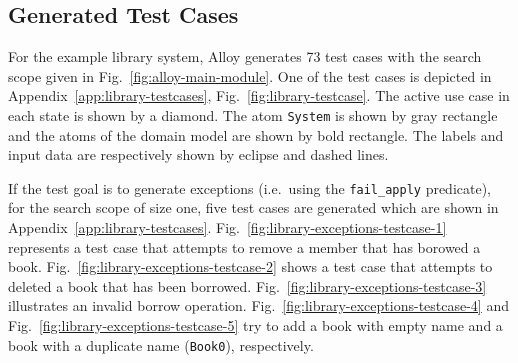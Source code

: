 \subsection{Generated Test Cases}
\label{sec:alloy-test-cases}
For the example library system, Alloy generates 73 test cases with the search scope given in Fig.~\ref{fig:alloy-main-module}. One of the test cases is depicted in Appendix~\ref{app:library-testcases}, Fig.~\ref{fig:library-testcase}. The active use case in each state is shown by a diamond. The atom \texttt{System} is shown by gray rectangle and the atoms of the domain model are shown by bold rectangle. The labels and input data are respectively shown by eclipse and dashed lines.

If the test goal is to generate exceptions (i.e.\ using the \texttt{fail\_apply} predicate), for the search scope of size one, five test cases are generated which are shown in Appendix~\ref{app:library-testcases}. Fig.~\ref{fig:library-exceptions-testcase-1} represents a test case that attempts to remove a member that has borowed a book. Fig.~\ref{fig:library-exceptions-testcase-2} shows a test case that attempts to deleted a book that has been borrowed. Fig.~\ref{fig:library-exceptions-testcase-3} illustrates an invalid borrow operation. Fig.~\ref{fig:library-exceptions-testcase-4} and Fig.~\ref{fig:library-exceptions-testcase-5} try to add a book with empty name and a book with a duplicate name (\texttt{Book0}), respectively.